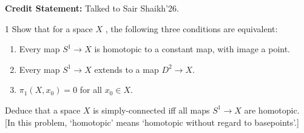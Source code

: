 \documentclass[12pt]{article}
\begin{document}


\textbf{Credit Statement:} Talked to Sair Shaikh'26. 

\begin{problem}{1}
     Show that for a space $X$ , the following three conditions are equivalent:
     \begin{enumerate}
        \item Every map $S^1 \to X$ is homotopic to a constant map, with image a point.
        \item Every map $S^1 \to X$ extends to a map $D^2 \to X$. 
        \item  $\pi_1 (X, x_0) = 0$ for all $x_0 \in X$.
     \end{enumerate}
     Deduce that a space $X$ is simply-connected iff all maps $S^1 \to X$ are homotopic. [In this problem, `homotopic' means `homotopic without regard to basepoints'.]
\end{problem}
\end{document}
